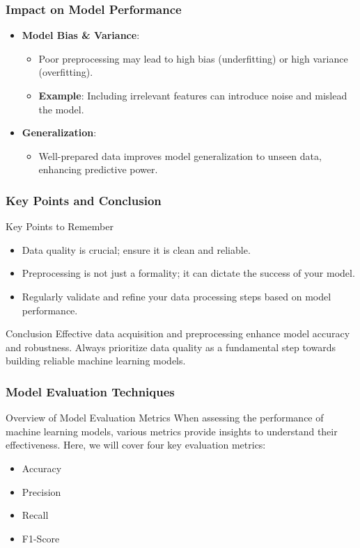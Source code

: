 \documentclass[aspectratio=169]{beamer}
\begin{document}
\begin{frame}[fragile]
    \frametitle{Impact on Model Performance}
    \begin{itemize}
        \item \textbf{Model Bias \& Variance}:
            \begin{itemize}
                \item Poor preprocessing may lead to high bias (underfitting) or high variance (overfitting).
                \item \textbf{Example}: Including irrelevant features can introduce noise and mislead the model.
            \end{itemize}
        \item \textbf{Generalization}:
            \begin{itemize}
                \item Well-prepared data improves model generalization to unseen data, enhancing predictive power.
            \end{itemize}
    \end{itemize}
\end{frame}

\begin{frame}[fragile]
    \frametitle{Key Points and Conclusion}
    \begin{block}{Key Points to Remember}
        \begin{itemize}
            \item Data quality is crucial; ensure it is clean and reliable.
            \item Preprocessing is not just a formality; it can dictate the success of your model.
            \item Regularly validate and refine your data processing steps based on model performance.
        \end{itemize}
    \end{block}
    \begin{block}{Conclusion}
        Effective data acquisition and preprocessing enhance model accuracy and robustness. Always prioritize data quality as a fundamental step towards building reliable machine learning models.
    \end{block}
\end{frame}

\begin{frame}[fragile]
    \frametitle{Model Evaluation Techniques}
    \begin{block}{Overview of Model Evaluation Metrics}
        When assessing the performance of machine learning models, various metrics provide insights to understand their effectiveness. Here, we will cover four key evaluation metrics: 
        \begin{itemize}
            \item Accuracy
            \item Precision
            \item Recall
            \item F1-Score
        \end{itemize}
    \end{block}
\end{frame}
\end{document}
